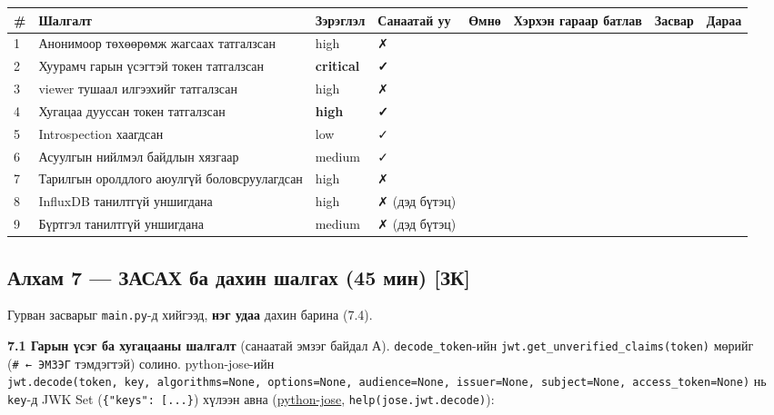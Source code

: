 \begingroup\scriptsize\begin{longtable}[]{@{}llllllll@{}}
\toprule
\# & Шалгалт & Зэрэглэл & Санаатай уу & Өмнө & Хэрхэн гараар батлав & Засвар & Дараа\tabularnewline
\midrule
\endhead
1 & Анонимоор төхөөрөмж жагсаах татгалзсан & high & ✗ & & & &\tabularnewline
2 & Хуурамч гарын үсэгтэй токен татгалзсан & \textbf{critical} & \textbf{✓} & & & &\tabularnewline
3 & viewer тушаал илгээхийг татгалзсан & high & ✗ & & & &\tabularnewline
4 & Хугацаа дууссан токен татгалзсан & \textbf{high} & \textbf{✓} & & & &\tabularnewline
5 & Introspection хаагдсан & low & ✓ & & & &\tabularnewline
6 & Асуулгын нийлмэл байдлын хязгаар & medium & ✓ & & & &\tabularnewline
7 & Тарилгын оролдлого аюулгүй боловсруулагдсан & high & ✗ & & & &\tabularnewline
8 & InfluxDB танилтгүй уншигдана & high & ✗ (дэд бүтэц) & & & &\tabularnewline
9 & Бүртгэл танилтгүй уншигдана & medium & ✗ (дэд бүтэц) & & & &\tabularnewline
\bottomrule
\end{longtable}\endgroup

\hypertarget{ux430ux43bux445ux430ux43c-7-ux437ux430ux441ux430ux445-ux431ux430-ux434ux430ux445ux438ux43d-ux448ux430ux43bux433ux430ux445-45-ux43cux438ux43d-ux437ux43a}{%
\subsection{Алхам 7 --- ЗАСАХ ба дахин шалгах (45 мин) {[}ЗК{]}}\label{ux430ux43bux445ux430ux43c-7-ux437ux430ux441ux430ux445-ux431ux430-ux434ux430ux445ux438ux43d-ux448ux430ux43bux433ux430ux445-45-ux43cux438ux43d-ux437ux43a}}

Гурван засварыг \texttt{main.py}-д хийгээд, \textbf{нэг удаа} дахин барина (7.4).

\textbf{7.1 Гарын үсэг ба хугацааны шалгалт} (санаатай эмзэг байдал А). \texttt{decode\_token}-ийн \texttt{jwt.\allowbreak{}get\_\allowbreak{}unverified\_\allowbreak{}claims(token)} мөрийг (\texttt{\#\ ←\ ЭМЗЭГ} тэмдэгтэй) солино. python-jose-ийн \texttt{jwt.\allowbreak{}decode(token,\ key,\ algorithms=\allowbreak{}None,\ options=\allowbreak{}None,\ audience=\allowbreak{}None,\ issuer=\allowbreak{}None,\ subject=\allowbreak{}None,\ access\_\allowbreak{}token=\allowbreak{}None)} нь \texttt{key}-д JWK Set (\texttt{\{"keys":\allowbreak{}\ {[}.\allowbreak{}.\allowbreak{}.\allowbreak{}{]}\}}) хүлээн авна (\href{https://pypi.org/project/python-jose/}{python-jose}, \texttt{help(jose.\allowbreak{}jwt.\allowbreak{}decode)}):


